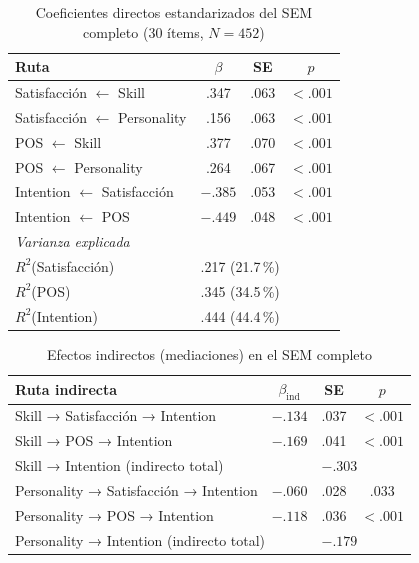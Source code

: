 \begin{table}[htbp]
\centering
\caption{Coeficientes directos estandarizados del SEM completo (30 ítems, $N=452$)}
\label{tab:sem-completo-paths}
\small
\begin{tabular}{@{}lccc@{}}
\toprule
\textbf{Ruta} & \textbf{$\beta$} & \textbf{SE} & \textbf{$p$} \\
\midrule
Satisfacción $\leftarrow$ Skill                 & .347 & .063 & $<.001$ \\
Satisfacción $\leftarrow$ Personality           & .156 & .063 & $<.001$ \\
POS $\leftarrow$ Skill                          & .377 & .070 & $<.001$ \\
POS $\leftarrow$ Personality                    & .264 & .067 & $<.001$ \\
Intention $\leftarrow$ Satisfacción             & $-.385$ & .053 & $<.001$ \\
Intention $\leftarrow$ POS                      & $-.449$ & .048 & $<.001$ \\
\multicolumn{4}{l}{\textit{Varianza explicada}} \\
\quad $R^2$(Satisfacción)  & \multicolumn{3}{l}{.217 (21.7\,\%)} \\
\quad $R^2$(POS)           & \multicolumn{3}{l}{.345 (34.5\,\%)} \\
\quad $R^2$(Intention)     & \multicolumn{3}{l}{.444 (44.4\,\%)} \\
\bottomrule
\end{tabular}
\end{table}

\begin{table}[htbp]
\centering
\caption{Efectos indirectos (mediaciones) en el SEM completo}
\label{tab:sem-completo-indirect}
\small
\begin{tabular}{@{}lccc@{}}
\toprule
\textbf{Ruta indirecta} & \textbf{$\beta_{\text{ind}}$} & \textbf{SE} & \textbf{$p$} \\
\midrule
Skill → Satisfacción → Intention          & $-.134$ & .037 & $<.001$ \\
Skill → POS → Intention                    & $-.169$ & .041 & $<.001$ \\
\multicolumn{2}{l}{Skill → Intention (indirecto total)} & \multicolumn{2}{l}{$-.303$} \\
Personality → Satisfacción → Intention    & $-.060$ & .028 & .033 \\
Personality → POS → Intention             & $-.118$ & .036 & $<.001$ \\
\multicolumn{2}{l}{Personality → Intention (indirecto total)} & \multicolumn{2}{l}{$-.179$} \\
\bottomrule
\end{tabular}
\end{table}

